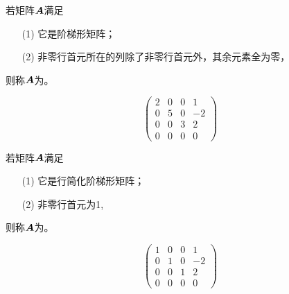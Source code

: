 \begin{frame}
  
    \begin{dingyi}[行简化阶梯形矩阵]
      若矩阵$\boldsymbol{A}$满足
      \begin{itemize}
      \item[(1)] 它是阶梯形矩阵；
      \item[(2)] 非零行首元所在的列除了非零行首元外，其余元素全为零，
      \end{itemize}
      则称$\boldsymbol{A}$为。
    \end{dingyi}
    \pause
    \begin{li}
      $$
      \left(
      \begin{array}{rrrr}
        2&0&0&1\\
        0&5&0&-2\\
        0&0&3&2\\
        0&0&0&0
      \end{array}
      \right)
      $$
    \end{li}
  
\end{frame}


\begin{frame}
  
    \begin{dingyi}[行最简阶梯形矩阵]
      若矩阵$\boldsymbol{A}$满足
      \begin{itemize}
      \item[(1)] 它是行简化阶梯形矩阵；
      \item[(2)] 非零行首元为1,
      \end{itemize}
      则称$\boldsymbol{A}$为。
    \end{dingyi}
    \pause
    \begin{li}
      $$
      \left(
      \begin{array}{rrrr}
        1&0&0&1\\
        0&1&0&-2\\
        0&0&1&2\\
        0&0&0&0
      \end{array}
      \right)
      $$
    \end{li}
  
\end{frame}